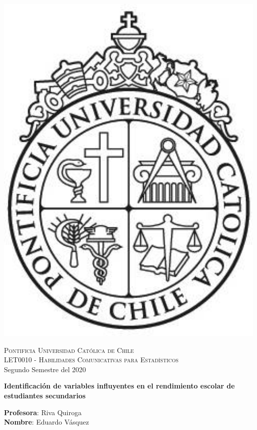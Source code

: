 \begin{minipage}{2cm}
    \includegraphics[width=1.2\textwidth]{archivos-rmd/logo-uc.jpg}
\end{minipage}

\begin{flushleft}
\noindent \textsc{Pontificia Universidad Cat\'olica de Chile \\
LET0010 - Habilidades Comunicativas para Estadísticos} \\
\noindent Segundo Semestre del 2020
\end{flushleft}

\vspace{10mm}
\begin{center}
\textbf{ \Large{Identificación de variables influyentes en el rendimiento escolar de estudiantes secundarios}}
\end{center}

\begin{flushright}
\noindent \textbf{Profesora}: Riva Quiroga\\
\noindent \textbf{Nombre}: Eduardo Vásquez
\end{flushright}

\vspace{10mm}